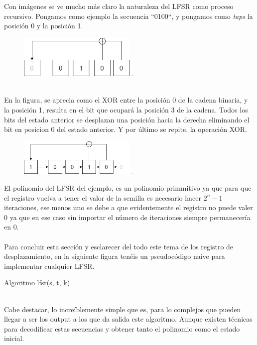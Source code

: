 Con imágenes se ve mucho más claro la naturaleza del LFSR como proceso recursivo. Pongamos como ejemplo la secuencia ``0100``, y pongamos como \textit{taps} la posición 0 y la posición 1. \\ 
\begin{figure}[h] 
    \centering
    \includegraphics[width=0.5\textwidth,keepaspectratio]{img/lfsr_01.png} .
    \label{fig:mi_imagen}
\end{figure}
\\
En la figura, se aprecia como el XOR entre la posición 0 de la cadena binaria, y la posición 1, resulta en el bit que ocupará la posición 3 de la cadena. Todos los bits del estado anterior se desplazan una posición hacia la derecha eliminando el bit en posicion 0 del estado anterior. Y por último se repite, la operación XOR.
\newpage
\begin{figure}[h] 
    \centering
    \includegraphics[width=0.5\textwidth,keepaspectratio]{img/lfsr02.png} .
    \label{fig:mi_imagen}
\end{figure}
\noindent El polinomio del LFSR del ejemplo, es un polinomio primmitivo ya que para que el registro vuelva a tener el valor de la semilla es necesario hacer $2^n-1$ iteraciones, ese menos uno se debe a que evidentemente el registro no puede valer 0 ya que en ese caso sin importar el número de iteraciones siempre permanecería en 0.\\\\
Para concluir esta sección y esclarecer del todo este tema de los registro de desplazamiento, en la siguiente figura tenéis un pseudocódigo naive para implementar cualquier LFSR.\\ 
\begin{algorithm}
\caption{Algoritmo lfsr(s, t, k)}\label{alg:zero}
\end{algorithm}
\\
Cabe destacar, lo increíblemente simple que es, para lo complejos que pueden llegar a ser los output a los que da salida este algoritmo. Aunque existen técnicas para decodificar estas secuencias y obtener tanto el polinomio como el estado inicial. %

